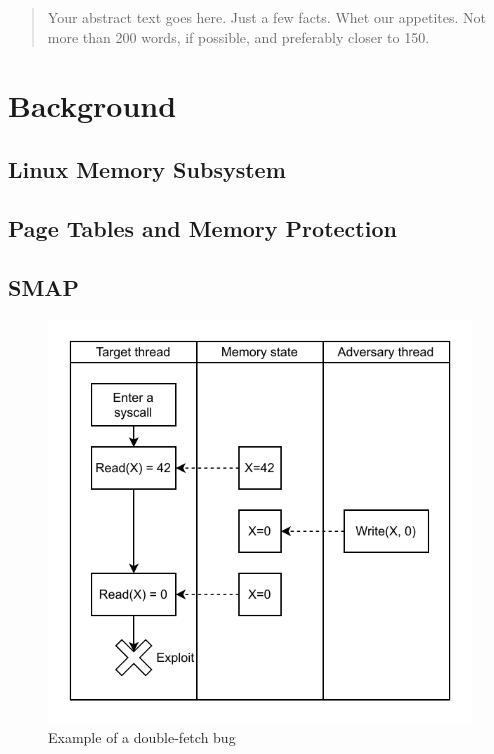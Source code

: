 \documentclass[letterpaper,twocolumn,10pt, anonymous]{article}
\begin{document}
\maketitle

\begin{abstract}
Your abstract text goes here. Just a few facts. Whet our appetites.
Not more than 200 words, if possible, and preferably closer to 150.
\end{abstract}


\section{Background}

\subsection{Linux Memory Subsystem}

\subsection{Page Tables and Memory Protection}

\subsection{SMAP}

\begin{figure}[]
  \centering
  \includegraphics[width=.85\linewidth]{img/doublefetch.pdf}
  \caption{Example of a double-fetch bug}
  \label{fig:doublefetch}
\end{figure}
\end{document}
